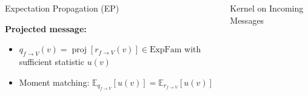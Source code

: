 \documentclass[english]{beamer}
\DeclareMathOperator*{\proj}{\text{proj}} %
\begin{document}
\begin{frame}
\begin{columns}[t]
\begin{block}{Expectation Propagation (EP)}
\vspace{-20mm}
\begin{figure}[ht]
\centering
\end{figure}
%
\vspace{1cm}
\textbf{Projected message:} 

\begin{itemize}
    \item $q_{f\rightarrow V}(v)=\proj\left[r_{f\rightarrow V}(v)\right] \in
        \text{ExpFam}$ with sufficient statistic $u(v)$

    \item Moment matching: $\mathbb{E}_{q_{f\rightarrow
        V}}\left[u(v)\right]=\mathbb{E}_{r_{f\rightarrow V}}\left[u(v)\right] $
\end{itemize}



%
\end{block}

\begin{block}{Kernel on Incoming Messages}


\end{block}
\end{columns}
\end{frame}
\end{document}
